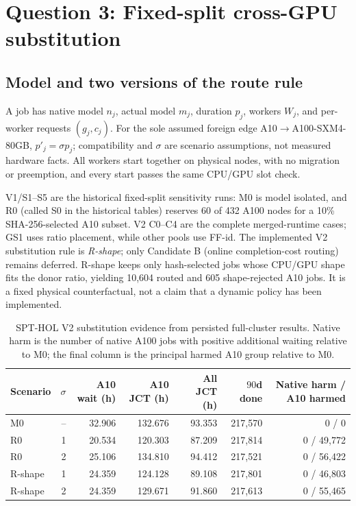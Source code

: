 \section{Question 3: Fixed-split cross-GPU substitution}
\label{sec:r1q3}
\subsection{Model and two versions of the route rule}
A job has native model $n_j$, actual model $m_j$, duration $p_j$, workers $W_j$, and per-worker requests $(g_j,c_j)$. For the sole assumed foreign edge A10$\to$A100-SXM4-80GB, $p'_j=\sigma p_j$; compatibility and $\sigma$ are scenario assumptions, not measured hardware facts. All workers start together on physical nodes, with no migration or preemption, and every start passes the same CPU/GPU slot check.

V1/S1--S5 are the historical fixed-split sensitivity runs: M0 is model isolated, and R0 (called S0 in the historical tables) reserves 60 of 432 A100 nodes for a 10\% SHA-256-selected A10 subset. V2 C0--C4 are the complete merged-runtime cases; GS1 uses ratio placement, while other pools use FF-id. The implemented V2 substitution rule is \emph{R-shape}; only Candidate B (online completion-cost routing) remains deferred. R-shape keeps only hash-selected jobs whose CPU/GPU shape fits the donor ratio, yielding 10,604 routed and 605 shape-rejected A10 jobs. It is a fixed physical counterfactual, not a claim that a dynamic policy has been implemented.

\begin{table}[H]\centering\caption{SPT-HOL V2 substitution evidence from persisted full-cluster results. Native harm is the number of native A100 jobs with positive additional waiting relative to M0; the final column is the principal harmed A10 group relative to M0.}\label{tab:r1q3main}\begin{tabular}{lrrrrrr}
\toprule
Scenario & $\sigma$ & A10 wait (h) & A10 JCT (h) & All JCT (h) & $90$d done & Native harm / A10 harmed\\
\midrule
M0 & -- &32.906&132.676&93.353&217,570&0 / 0\\
R0 &1&20.534&120.303&87.209&217,814&0 / 49,772\\
R0 &2&25.106&134.810&94.412&217,521&0 / 56,422\\
R-shape &1&24.359&124.128&89.108&217,801&0 / 46,803\\
R-shape &2&24.359&129.671&91.860&217,613&0 / 55,465\\
\bottomrule
\end{tabular}\end{table}


